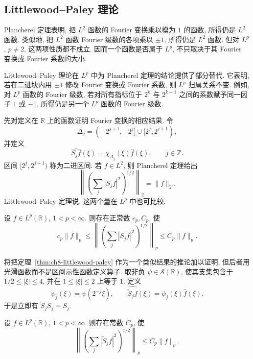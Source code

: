 \subsection{Littlewood--Paley 理论}
\label{sec:ch8-littlewood-paley-theory}

Plancherel 定理表明, 把 $L^2$ 函数的 Fourier 变换乘以模为 $1$ 的函数, 所得仍是 $L^2$ 函数. 类似地, 把 $L^2$ 函数 Fourier 级数的各项乘以 $\pm1$, 所得仍是 $L^2$ 函数. 但对 $L^p$, $p\ne2$, 这两项性质都不成立. 因而一个函数是否属于 $L^p$, 不只取决于其 Fourier 变换或 Fourier 系数的大小.

Littlewood--Paley 理论在 $L^p$ 中为 Plancherel 定理的结论提供了部分替代. 它表明, 若在二进块内用 $\pm1$ 修改 Fourier 变换或 Fourier 系数, 则 $L^p$ 归属关系不变. 例如, 对 $L^p$ 函数的 Fourier 级数, 若对所有指标位于 $2^k$ 与 $2^{k+1}$ 之间的系数赋予同一因子 $1$ 或 $-1$, 所得仍是另一个 $L^p$ 函数的 Fourier 级数.

\hypertarget{chapter-08-page-172}{}
先对定义在 $\mathbb R$ 上的函数证明 Fourier 变换的相应结果. 令
\[
 \Delta_j=(-2^{j+1},-2^j]\cup[2^j,2^{j+1}),
\]
并定义
\[
 \widehat{S_jf}(\xi)=\chi_{\Delta_j}(\xi)\widehat f(\xi),
 \qquad j\in\mathbb Z.
\]
区间 $[2^j,2^{j+1})$ 称为二进区间. 若 $f\in L^2$, 则 Plancherel 定理给出
\begin{equation}
\label{eq:ch8-lp-l2-identity}
 \left\|\left(\sum_j|S_jf|^2\right)^{1/2}\right\|_2=\|f\|_2.
\end{equation}
Littlewood--Paley 定理说, 这两个量在 $L^p$ 中也可比较.

\begin{Theorem}
\label{thm:ch8-littlewood-paley}
设 $f\in L^p(\mathbb R)$, $1<p<\infty$. 则存在正常数 $c_p,C_p$, 使
\begin{equation}
\label{eq:ch8-littlewood-paley}
 c_p\|f\|_p
 \le\left\|\left(\sum_j|S_jf|^2\right)^{1/2}\right\|_p
 \le C_p\|f\|_p.
\end{equation}
\end{Theorem}

将把定理~\ref{thm:ch8-littlewood-paley} 作为一个类似结果的推论加以证明, 但后者用光滑函数而不是区间示性函数定义算子. 取非负 $\psi\in\mathcal S(\mathbb R)$, 使其支集包含于 $1/2\le|\xi|\le4$, 并在 $1\le|\xi|\le2$ 上等于 $1$. 定义
\[
 \psi_j(\xi)=\psi(2^{-j}\xi),
 \qquad
 \widehat{\widetilde S_jf}(\xi)=\psi_j(\xi)\widehat f(\xi).
\]
于是立即有 $\widetilde S_jS_j=S_j$.

\begin{Theorem}
\label{thm:ch8-smooth-square-function}
设 $f\in L^p(\mathbb R)$, $1<p<\infty$. 则存在常数 $C_p$, 使
\begin{equation}
\label{eq:ch8-smooth-square-function}
 \left\|\left(\sum_j|\widetilde S_jf|^2\right)^{1/2}\right\|_p
 \le C_p\|f\|_p.
\end{equation}
\end{Theorem}

